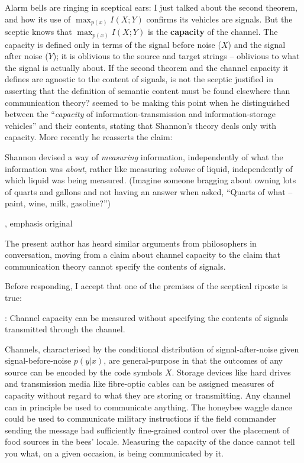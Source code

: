 Alarm bells are ringing in sceptical ears: I just talked about the second theorem, and how its use of $\max_{p(x)}I(X;Y)$ confirms its vehicles are signals.
But the sceptic knows that $\max_{p(x)}I(X;Y)$ is the \textbf{capacity} of the channel.
The capacity is defined only in terms of the signal before noise ($X$) and the signal after noise ($Y$); it is oblivious to the source and target strings -- oblivious to what the signal is actually about.
If the second theorem and the channel capacity it defines are agnostic to the content of signals, is not the sceptic justified in asserting that the definition of semantic content must be found elsewhere than communication theory?
\citet[344]{dennett1983intentional} seemed to be making this point when he distinguished between the ``\textit{capacity} of information-transmission and information-storage vehicles'' and their contents, stating that Shannon's theory deals only with capacity.
More recently he reasserts the claim:

\begin{myquote}
Shannon devised a way of \textit{measuring} information, independently of what the information was \textit{about}, rather like measuring \textit{volume} of liquid, independently of which liquid was being measured. (Imagine someone bragging about owning lots of quarts and gallons and not having an answer when asked, ``Quarts of what -- paint, wine, milk, gasoline?'')
\par\hspace*{\fill}\citet[106]{dennett2017bacteria}, emphasis original
\end{myquote}

\noindent The present author has heard similar arguments from philosophers in conversation, moving from a claim about channel capacity to the claim that communication theory cannot specify the contents of signals.

Before responding, I accept that one of the premises of the sceptical riposte is true:

\begin{myquote}
\cia{}: Channel capacity can be measured without specifying the contents of signals transmitted through the channel.
\end{myquote}

\noindent Channels, characterised by the conditional distribution of signal-after-noise given signal-before-noise $p(y|x)$, are general-purpose in that the outcomes of any source can be encoded by the code symbols $X$.
Storage devices like hard drives and transmission media like fibre-optic cables can be assigned measures of capacity without regard to what they are storing or transmitting.
Any channel can in principle be used to communicate anything.
The honeybee waggle dance could be used to communicate military instructions if the field commander sending the message had sufficiently fine-grained control over the placement of food sources in the bees' locale.
Measuring the capacity of the dance cannot tell you what, on a given occasion, is being communicated by it.

